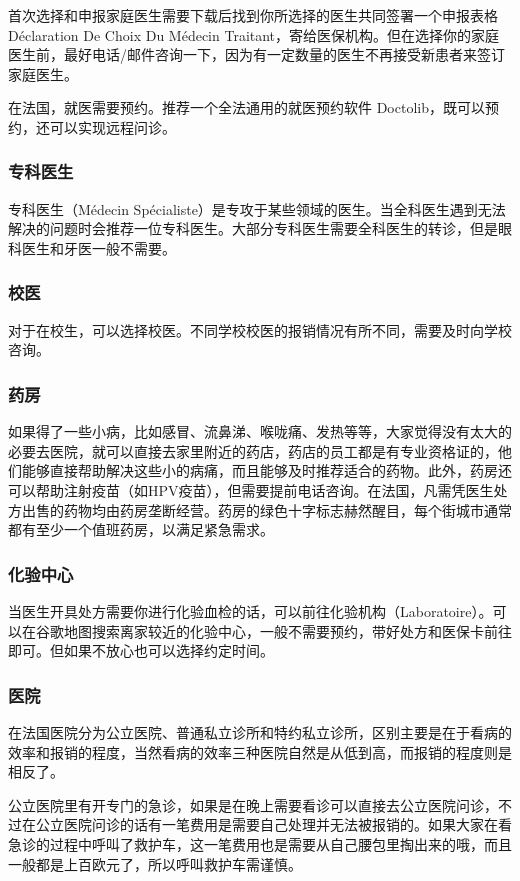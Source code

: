 \documentclass[UTF8]{ctexart}
\begin{document}
首次选择和申报家庭医生需要下载后找到你所选择的医生共同签署一个申报表格Déclaration De Choix Du Médecin Traitant，寄给医保机构。但在选择你的家庭医生前，最好电话/邮件咨询一下，因为有一定数量的医生不再接受新患者来签订家庭医生。

在法国，就医需要预约。推荐一个全法通用的就医预约软件 Doctolib，既可以预约，还可以实现远程问诊。

\subsubsection{专科医生}
专科医生（Médecin Spécialiste）是专攻于某些领域的医生。当全科医生遇到无法解决的问题时会推荐一位专科医生。大部分专科医生需要全科医生的转诊，但是眼科医生和牙医一般不需要。

\subsubsection{校医}
对于在校生，可以选择校医。不同学校校医的报销情况有所不同，需要及时向学校咨询。

\subsubsection{药房}
如果得了一些小病，比如感冒、流鼻涕、喉咙痛、发热等等，大家觉得没有太大的必要去医院，就可以直接去家里附近的药店，药店的员工都是有专业资格证的，他们能够直接帮助解决这些小的病痛，而且能够及时推荐适合的药物。此外，药房还可以帮助注射疫苗（如HPV疫苗），但需要提前电话咨询。在法国，凡需凭医生处方出售的药物均由药房垄断经营。药房的绿色十字标志赫然醒目，每个街城市通常都有至少一个值班药房，以满足紧急需求。

\subsubsection{化验中心}
当医生开具处方需要你进行化验血检的话，可以前往化验机构（Laboratoire）。可以在谷歌地图搜索离家较近的化验中心，一般不需要预约，带好处方和医保卡前往即可。但如果不放心也可以选择约定时间。

\subsubsection{医院}
在法国医院分为公立医院、普通私立诊所和特约私立诊所，区别主要是在于看病的效率和报销的程度，当然看病的效率三种医院自然是从低到高，而报销的程度则是相反了。

公立医院里有开专门的急诊，如果是在晚上需要看诊可以直接去公立医院问诊，不过在公立医院问诊的话有一笔费用是需要自己处理并无法被报销的。如果大家在看急诊的过程中呼叫了救护车，这一笔费用也是需要从自己腰包里掏出来的哦，而且一般都是上百欧元了，所以呼叫救护车需谨慎。
\end{document}

